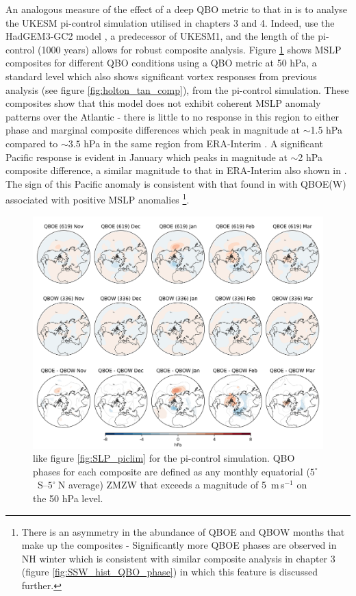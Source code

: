 An analogous measure of the effect of a deep QBO metric to that in \cite{andrewsObserved2019d} is to analyse the UKESM pi-control simulation utilised in chapters 3 and 4. Indeed, \cite{andrewsObserved2019d} use the HadGEM3-GC2 model \citep{williamsMet2018b}, a predecessor of UKESM1, and the length of the pi-control (1000 years) allows for robust composite analysis. Figure \ref{fig:SLP_picontrol_50} shows MSLP composites for different QBO conditions using a QBO metric at 50 hPa, a standard level which also shows significant vortex responses from previous analysis (see figure \ref{fig:holton_tan_comp}), from the pi-control simulation. These composites show that this model does not exhibit coherent MSLP anomaly patterns over the Atlantic - there is little to no response in this region to either phase and marginal composite differences which peak in magnitude at $\sim$1.5 hPa compared to $\sim3.5$ hPa in the same region from ERA-Interim \citep{andrewsObserved2019d}. A significant Pacific response is evident in January which peaks in magnitude at $\sim$2 hPa composite difference, a similar magnitude to that in ERA-Interim also shown in \cite{andrewsObserved2019d}. The sign of this Pacific anomaly is consistent with that found in \cite{graySurface2018b} with QBOE(W) associated with positive MSLP anomalies \footnote{There is an asymmetry in the abundance of QBOE and QBOW months that make up the composites - Significantly more QBOE phases are observed in NH winter which is consistent with similar composite analysis in chapter 3 (figure \ref{fig:SSW_hist_QBO_phase}) in which this feature is discussed further.}.

\begin{figure}[h!]
\begin{center}
\noindent\includegraphics[width = 0.8\linewidth]{Figures/Figures-deepQBO/LAGGED_SLP_composites_individual_months_QBO_phases_U_picontrol_50hPa_5thresh.png}
\caption[MSLP composites under different 50 hPa QBO phases in the pi-control simulation]{like figure \ref{fig:SLP_piclim} for the pi-control simulation. QBO phases for each composite are defined as any monthly equatorial ($5^{\circ}$\ S--$5^{\circ}\ $N average) ZMZW that exceeds a magnitude of 5\ m\,s$^{-1}$ on the 50 hPa level.}
\label{fig:SLP_picontrol_50}
\end{center}
\end{figure}

